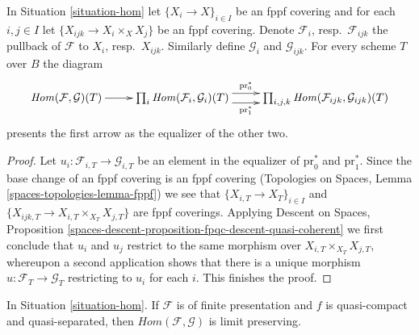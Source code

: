 \begin{lemma}
\label{lemma-hom-sheaf-in-X}
In Situation \ref{situation-hom} let $\{X_i \to X\}_{i \in I}$ be an fppf
covering and for each $i, j \in I$ let $\{X_{ijk} \to X_i \times_X X_j\}$
be an fppf covering. Denote $\mathcal{F}_i$, resp.\ $\mathcal{F}_{ijk}$
the pullback of $\mathcal{F}$ to $X_i$, resp.\ $X_{ijk}$. Similarly
define $\mathcal{G}_i$ and $\mathcal{G}_{ijk}$. For every scheme
$T$ over $B$ the diagram
$$
\xymatrix{
\mathit{Hom}(\mathcal{F}, \mathcal{G})(T) \ar[r] &
\prod\nolimits_i
\mathit{Hom}(\mathcal{F}_i, \mathcal{G}_i)(T)
\ar@<1ex>[r]^-{\text{pr}_0^*} \ar@<-1ex>[r]_-{\text{pr}_1^*}
&
\prod\nolimits_{i, j, k}
\mathit{Hom}(\mathcal{F}_{ijk}, \mathcal{G}_{ijk})(T)
}
$$
presents the first arrow as the equalizer of the other two.
\end{lemma}

\begin{proof}
Let $u_i : \mathcal{F}_{i, T} \to \mathcal{G}_{i, T}$ be an element in the
equalizer of $\text{pr}_0^*$ and $\text{pr}_1^*$. Since the base change
of an fppf covering is an fppf covering
(Topologies on Spaces, Lemma \ref{spaces-topologies-lemma-fppf})
we see that $\{X_{i, T} \to X_T\}_{i \in I}$ and
$\{X_{ijk, T} \to X_{i, T} \times_{X_T} X_{j, T}\}$ are fppf coverings.
Applying Descent on Spaces, Proposition
\ref{spaces-descent-proposition-fpqc-descent-quasi-coherent}
we first conclude that $u_i$ and $u_j$ restrict to the same morphism
over $X_{i, T} \times_{X_T} X_{j, T}$, whereupon a second application
shows that there is a unique morphism $u : \mathcal{F}_T \to \mathcal{G}_T$
restricting to $u_i$ for each $i$. This finishes the proof.
\end{proof}

\begin{lemma}
\label{lemma-hom-limits}
In Situation \ref{situation-hom}. If $\mathcal{F}$ is of finite presentation
and $f$ is quasi-compact and quasi-separated, then
$\mathit{Hom}(\mathcal{F}, \mathcal{G})$ is limit preserving.
\end{lemma}

